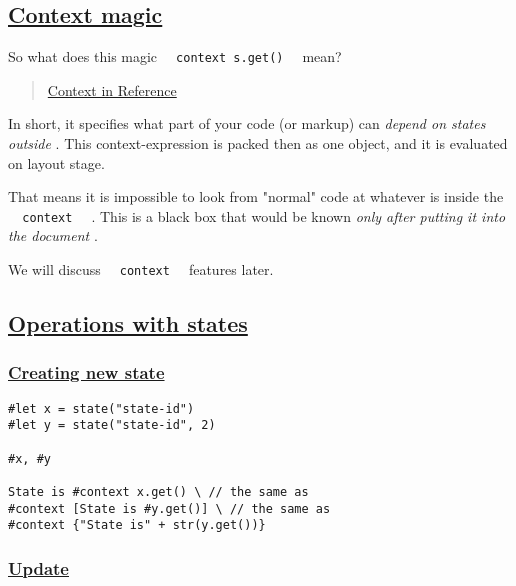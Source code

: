 \subsection{\texorpdfstring{\hyperref[context-magic]{Context
magic}}{Context magic}}\label{context-magic}

So what does this magic
\texttt{\ }{\texttt{\ context\ s.get()\ }}\texttt{\ } mean?

\begin{quote}
\href{https://typst.app/docs/reference/context/}{Context in Reference}
\end{quote}

In short, it specifies what part of your code (or markup) can
\emph{depend on states outside} . This context-expression is packed then
as one object, and it is evaluated on layout stage.

That means it is impossible to look from "normal" code at whatever is
inside the \texttt{\ }{\texttt{\ context\ }}\texttt{\ } . This is a
black box that would be known \emph{only after putting it into the
document} .

We will discuss \texttt{\ }{\texttt{\ context\ }}\texttt{\ } features
later.

\subsection{\texorpdfstring{\hyperref[operations-with-states]{Operations
with states}}{Operations with states}}\label{operations-with-states}

\subsubsection{\texorpdfstring{\hyperref[creating-new-state]{Creating
new state}}{Creating new state}}\label{creating-new-state}

\begin{verbatim}
#let x = state("state-id")
#let y = state("state-id", 2)

#x, #y

State is #context x.get() \ // the same as
#context [State is #y.get()] \ // the same as
#context {"State is" + str(y.get())}
\end{verbatim}

\pandocbounded{}

\subsubsection{\texorpdfstring{\hyperref[update]{Update}}{Update}}\label{update}

